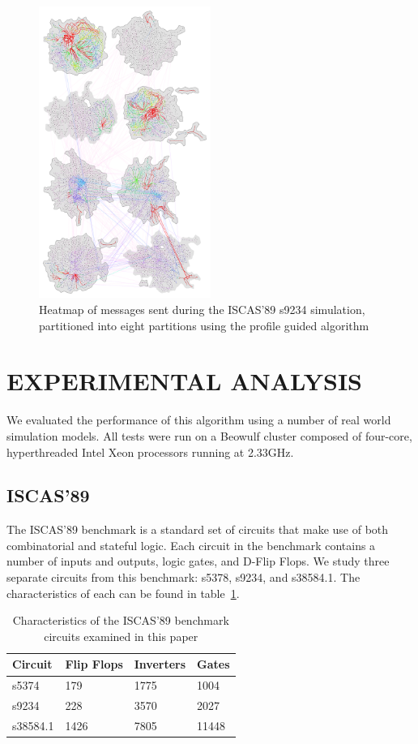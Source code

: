 \documentclass{wscpaperproc}
\begin{document}
\begin{figure}[h]
\centering
\includegraphics[clip=true,width=0.5\textwidth]{s9234_8part}
\caption{Heatmap of messages sent during the ISCAS'89 s9234 simulation, partitioned into eight partitions using the profile guided algorithm}
\label{fig:iscas8part}
\end{figure}

\section{EXPERIMENTAL ANALYSIS}\label{sec:analysis}

We evaluated the performance of this algorithm using a number of real world simulation models. All tests were run on a Beowulf cluster composed of four-core, hyperthreaded Intel Xeon processors running at 2.33GHz.

\subsection{ISCAS’89}
The ISCAS’89 benchmark is a standard set of circuits that make use of both combinatorial and stateful logic. Each circuit in the benchmark contains a number of inputs and outputs, logic gates, and D-Flip Flops. We study three separate circuits from this benchmark: s5378, s9234, and s38584.1. The characteristics of each can be found in table~\ref{table:iscasStats}.

\begin{table}[h]
\centering
\begin{tabular}{@{}llll@{}}
\toprule
Circuit  & Flip Flops & Inverters & Gates \\ \midrule
s5374    & 179        & 1775      & 1004  \\
s9234    & 228        & 3570      & 2027  \\
s38584.1 & 1426       & 7805      & 11448 \\ \bottomrule
\end{tabular}
\caption{Characteristics of the ISCAS'89 benchmark circuits examined in this paper}
\label{table:iscasStats}
\end{table}
\end{document}

